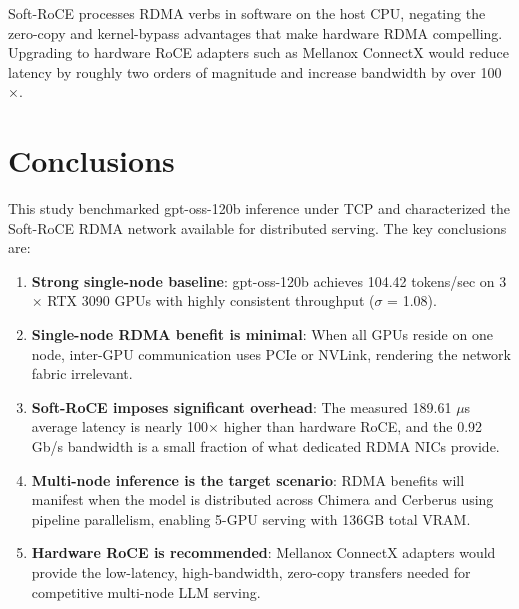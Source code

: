 \documentclass[10pt,letterpaper]{article}
\begin{document}
Soft-RoCE processes RDMA verbs in software on the host CPU, negating the zero-copy and kernel-bypass advantages that make hardware RDMA compelling. Upgrading to hardware RoCE adapters such as Mellanox ConnectX \cite{mofed-docs} would reduce latency by roughly two orders of magnitude and increase bandwidth by over 100$\times$.

\section{Conclusions}

This study benchmarked gpt-oss-120b inference under TCP and characterized the Soft-RoCE RDMA network available for distributed serving. The key conclusions are:

\begin{enumerate}[noitemsep]
    \item \textbf{Strong single-node baseline}: gpt-oss-120b achieves 104.42 tokens/sec on 3$\times$ RTX 3090 GPUs with highly consistent throughput ($\sigma$ = 1.08).
    \item \textbf{Single-node RDMA benefit is minimal}: When all GPUs reside on one node, inter-GPU communication uses PCIe or NVLink, rendering the network fabric irrelevant.
    \item \textbf{Soft-RoCE imposes significant overhead}: The measured 189.61 $\mu$s average latency is nearly 100$\times$ higher than hardware RoCE, and the 0.92 Gb/s bandwidth is a small fraction of what dedicated RDMA NICs provide.
    \item \textbf{Multi-node inference is the target scenario}: RDMA benefits will manifest when the model is distributed across Chimera and Cerberus using pipeline parallelism, enabling 5-GPU serving with 136GB total VRAM.
    \item \textbf{Hardware RoCE is recommended}: Mellanox ConnectX adapters \cite{mofed-docs} would provide the low-latency, high-bandwidth, zero-copy transfers needed for competitive multi-node LLM serving.
\end{enumerate}
\end{document}

